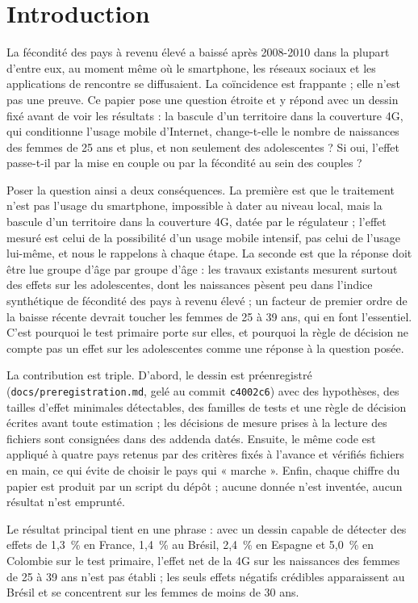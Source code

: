 \documentclass[11pt,a4paper]{article}
\begin{document}
\section{Introduction}

La fécondité des pays à revenu élevé a baissé après 2008-2010 dans la plupart d'entre eux, au moment même où le smartphone, les réseaux sociaux et les applications de rencontre se diffusaient. La coïncidence est frappante ; elle n'est pas une preuve. Ce papier pose une question étroite et y répond avec un dessin fixé avant de voir les résultats : la bascule d'un territoire dans la couverture 4G, qui conditionne l'usage mobile d'Internet, change-t-elle le nombre de naissances des femmes de 25 ans et plus, et non seulement des adolescentes ? Si oui, l'effet passe-t-il par la mise en couple ou par la fécondité au sein des couples ?

Poser la question ainsi a deux conséquences. La première est que le traitement n'est pas l'usage du smartphone, impossible à dater au niveau local, mais la bascule d'un territoire dans la couverture 4G, datée par le régulateur ; l'effet mesuré est celui de la possibilité d'un usage mobile intensif, pas celui de l'usage lui-même, et nous le rappelons à chaque étape. La seconde est que la réponse doit être lue groupe d'âge par groupe d'âge : les travaux existants mesurent surtout des effets sur les adolescentes, dont les naissances pèsent peu dans l'indice synthétique de fécondité des pays à revenu élevé ; un facteur de premier ordre de la baisse récente devrait toucher les femmes de 25 à 39 ans, qui en font l'essentiel. C'est pourquoi le test primaire porte sur elles, et pourquoi la règle de décision ne compte pas un effet sur les adolescentes comme une réponse à la question posée.

La contribution est triple. D'abord, le dessin est préenregistré (\texttt{docs/preregistration.md}, gelé au commit \texttt{c4002c6}) avec des hypothèses, des tailles d'effet minimales détectables, des familles de tests et une règle de décision écrites avant toute estimation ; les décisions de mesure prises à la lecture des fichiers sont consignées dans des addenda datés. Ensuite, le même code est appliqué à quatre pays retenus par des critères fixés à l'avance et vérifiés fichiers en main, ce qui évite de choisir le pays qui « marche ». Enfin, chaque chiffre du papier est produit par un script du dépôt ; aucune donnée n'est inventée, aucun résultat n'est emprunté.

Le résultat principal tient en une phrase : avec un dessin capable de détecter des effets de 1,3~\% en France, 1,4~\% au Brésil, 2,4~\% en Espagne et 5,0~\% en Colombie sur le test primaire, l'effet net de la 4G sur les naissances des femmes de 25 à 39 ans n'est pas établi ; les seuls effets négatifs crédibles apparaissent au Brésil et se concentrent sur les femmes de moins de 30 ans.
\end{document}
